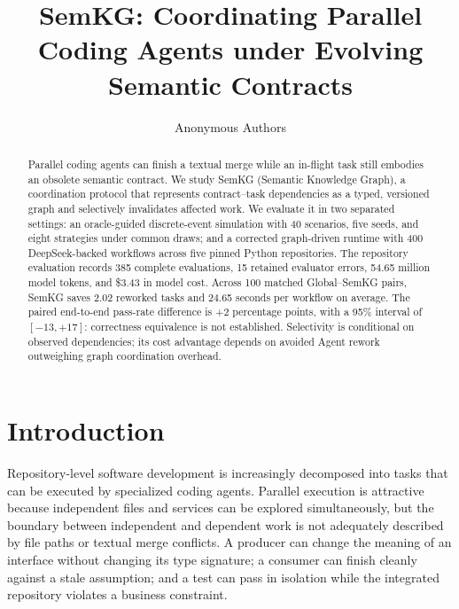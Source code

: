 \documentclass[a4paper,runningheads]{llncs}
\begin{document}
\frontmatter
\pagestyle{headings}
\mainmatter
\title{SemKG: Coordinating Parallel Coding Agents under Evolving Semantic Contracts}
\author{Anonymous Authors}
\maketitle

\begin{abstract}
Parallel coding agents can finish a textual merge while an in-flight task still embodies an obsolete semantic contract. We study SemKG (Semantic Knowledge Graph), a coordination protocol that represents contract--task dependencies as a typed, versioned graph and selectively invalidates affected work. We evaluate it in two separated settings: an oracle-guided discrete-event simulation with 40 scenarios, five seeds, and eight strategies under common draws; and a corrected graph-driven runtime with 400 DeepSeek-backed workflows across five pinned Python repositories. The repository evaluation records 385 complete evaluations, 15 retained evaluator errors, 54.65 million model tokens, and \$3.43 in model cost. Across 100 matched Global--SemKG pairs, SemKG saves 2.02 reworked tasks and 24.65 seconds per workflow on average. The paired end-to-end pass-rate difference is +2 percentage points, with a 95\% interval of $[-13,+17]$: correctness equivalence is not established. Selectivity is conditional on observed dependencies; its cost advantage depends on avoided Agent rework outweighing graph coordination overhead.
\end{abstract}

\section{Introduction}
Repository-level software development is increasingly decomposed into tasks that can be executed by specialized coding agents. Parallel execution is attractive because independent files and services can be explored simultaneously, but the boundary between independent and dependent work is not adequately described by file paths or textual merge conflicts. A producer can change the meaning of an interface without changing its type signature; a consumer can finish cleanly against a stale assumption; and a test can pass in isolation while the integrated repository violates a business constraint.
\end{document}
